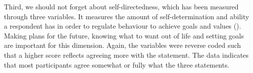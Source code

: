 \documentclass[11pt]{article}
\begin{document}
\begin{table}[h!]
\captionsetup{singlelinecheck=off}
\caption{Harm avoidance distribution}
\end{table}

\begin{table}[h!]
\captionsetup{singlelinecheck=off}
\caption{Harm avoidance distribution}
\end{table}

Third, we should not forget about self-directedness, which has been measured
through three variables. It measures the amount of self-determination and ability
a respondent has in order to regulate behaviour to achieve goals and values
(\cite{tse2011}). Making plans for the future, knowing what to want out of life
and setting goals are important for this dimension. Again, the variables were
reverse coded such that a higher score reflects agreeing more with the statement.
The data indicates that most participants agree somewhat or fully what the three
statements.
\end{document}
